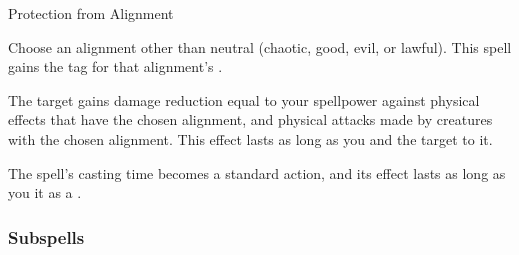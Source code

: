\newpage
\begin{spellsection}{Protection from Alignment}

\begin{spellcontent}

\begin{spelltargetinginfo}



\end{spelltargetinginfo}


\begin{spelleffects}
\spellspecial
Choose an alignment other than neutral (chaotic, good, evil, or lawful).
This spell gains the tag for that alignment's .



\spelleffect
The target gains damage reduction equal to your spellpower against physical effects that have the chosen alignment, and physical attacks made by creatures with the chosen alignment.
This effect lasts as long as you and the target  to it.








\end{spelleffects}

\end{spellcontent}
\begin{spellfooter}


\end{spellfooter}
\begin{spellsubcontent}


\begin{spellcantrip}
The spell's casting time becomes a standard action, and its effect lasts as long as you  it as a .
\end{spellcantrip}


\end{spellsubcontent}
\end{spellsection}


\subsubsection{Subspells}



